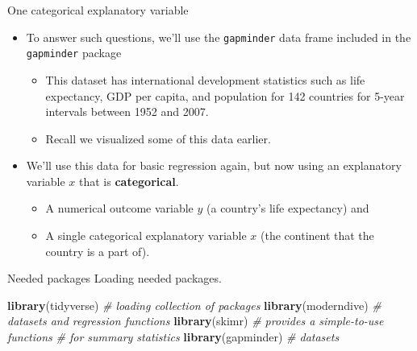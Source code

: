 \documentclass[
  ignorenonframetext,
]{beamer}
\newenvironment{Shaded}{\begin{snugshade}}{\end{snugshade}}
\newcommand{\CommentTok}[1]{\textcolor[rgb]{0.56,0.35,0.01}{\textit{#1}}}
\newcommand{\FunctionTok}[1]{\textcolor[rgb]{0.13,0.29,0.53}{\textbf{#1}}}
\newcommand{\NormalTok}[1]{#1}
\providecommand{\tightlist}{%
  \setlength{\itemsep}{0pt}\setlength{\parskip}{0pt}}
\begin{document}
\begin{frame}[fragile]{One categorical explanatory variable}
\protect\hypertarget{one-categorical-explanatory-variable-2}{}
\begin{itemize}
\item
  To answer such questions, we'll use the \texttt{gapminder} data frame
  included in the \texttt{gapminder} package

  \begin{itemize}
  \item
    This dataset has international development statistics such as life
    expectancy, GDP per capita, and population for 142 countries for
    5-year intervals between 1952 and 2007.
  \item
    Recall we visualized some of this data earlier.
  \end{itemize}
\item
  We'll use this data for basic regression again, but now using an
  explanatory variable \(x\) that is \textbf{categorical}.

  \begin{itemize}
  \tightlist
  \item
    A numerical outcome variable \(y\) (a country's life expectancy) and
  \item
    A single categorical explanatory variable \(x\) (the continent that
    the country is a part of).
  \end{itemize}
\end{itemize}
\end{frame}

\begin{frame}[fragile]{Needed packages}
\protect\hypertarget{needed-packages}{}
Loading needed packages.

\begin{Shaded}
\begin{Highlighting}[]
\FunctionTok{library}\NormalTok{(tidyverse)   }\CommentTok{\# loading collection of packages}
\FunctionTok{library}\NormalTok{(moderndive)  }\CommentTok{\# datasets and regression functions}
\FunctionTok{library}\NormalTok{(skimr)       }\CommentTok{\# provides a simple{-}to{-}use functions }
                     \CommentTok{\# for summary statistics}
\FunctionTok{library}\NormalTok{(gapminder)   }\CommentTok{\# datasets}
\end{Highlighting}
\end{Shaded}
\end{frame}
\end{document}
